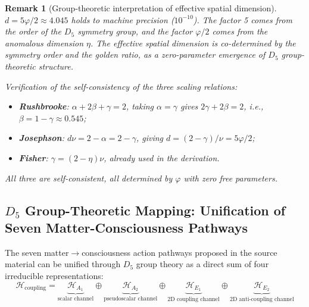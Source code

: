 \documentclass[12pt,a4paper,twocolumn]{article}
\renewcommand{\phi}{\varphi}
\newtheorem{remark}[theorem]{Remark}
\begin{document}
\begin{remark}[Group-theoretic interpretation of effective spatial dimension]
$d = 5\phi/2 \approx 4.045$ holds to machine precision ($10^{-10}$). The factor 5 comes from the order of the $D_5$ symmetry group, and the factor $\phi/2$ comes from the anomalous dimension $\eta$. The effective spatial dimension is co-determined by the symmetry order and the golden ratio, as a zero-parameter emergence of $D_5$ group-theoretic structure.

Verification of the self-consistency of the three scaling relations:
\begin{itemize}
\item \textbf{Rushbrooke}: $\alpha + 2\beta + \gamma = 2$, taking $\alpha = \gamma$ gives $2\gamma + 2\beta = 2$, i.e., $\beta = 1 - \gamma \approx 0.545$;
\item \textbf{Josephson}: $d\nu = 2-\alpha = 2-\gamma$, giving $d = (2-\gamma)/\nu = 5\phi/2$;
\item \textbf{Fisher}: $\gamma = (2-\eta)\nu$, already used in the derivation.
\end{itemize}
All three are self-consistent, all determined by $\phi$ with zero free parameters.
\end{remark}

\subsection{$D_5$ Group-Theoretic Mapping: Unification of Seven Matter-Consciousness Pathways}
\label{subsec:seven_paths_en}

The seven matter$\to$consciousness action pathways proposed in the source material can be unified through $D_5$ group theory as a direct sum of four irreducible representations:
\begin{equation}
\mathcal{H}_{\text{coupling}} = \underbrace{\mathcal{H}_{A_1}}_{\text{scalar channel}} \oplus \underbrace{\mathcal{H}_{A_2}}_{\text{pseudoscalar channel}} \oplus \underbrace{\mathcal{H}_{E_1}}_{\text{2D coupling channel}} \oplus \underbrace{\mathcal{H}_{E_2}}_{\text{2D anti-coupling channel}}
\end{equation}
\end{document}
